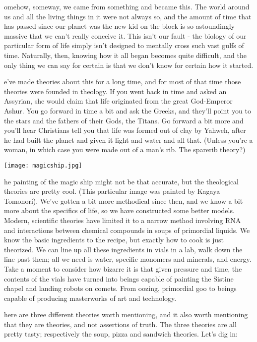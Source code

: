 omehow, someway, we came from something and became this. The world around us and all the living things in it were not always so, and the amount of time that has passed since our planet was the new kid on the block is so astoundingly massive that we can’t really conceive it. This isn’t our fault - the biology of our particular form of life simply isn’t designed to mentally cross such vast gulfs of time. Naturally, then, knowing how it all began becomes quite difficult, and the only thing we can say for certain is that we don’t know for certain how it started.

e’ve made theories about this for a long time, and for most of that time those theories were founded in theology. If you went back in time and asked an Assyrian, she would claim that life originated from the great God-Emperor Ashur. You go forward in time a bit and ask the Greeks, and they’ll point you to the stars and the fathers of their Gods, the Titans. Go forward a bit more and you’ll hear Christians tell you that life was formed out of clay by Yahweh, after he had built the planet and given it light and water and all that. (Unless you’re a woman, in which case you were made out of a man’s rib. The sparerib theory?) 

\begin{center}
	\texttt{[image: magicship.jpg]}
\end{center}

he painting of the magic ship might not be that accurate, but the theological theories are pretty cool. (This particular image was painted by Kagaya Tomonori). We’ve gotten a bit more methodical since then, and we know a bit more about the specifics of life, so we have constructed some better models. Modern, scientific theories have limited it to a narrow method involving RNA and interactions between chemical compounds in soups of primordial liquids. We know the basic ingredients to the recipe, but exactly how to cook is just theorized. We can line up all these ingredients in vials in a lab, walk down the line past them; all we need is water, specific monomers and minerals, and energy. Take a moment to consider how bizarre it is that given pressure and time, the contents of the vials have turned into beings capable of painting the Sistine chapel and landing robots on comets. From oozing, primordial goo to beings capable of producing masterworks of art and technology.

here are three different theories worth mentioning, and it also worth mentioning that they are theories, and not assertions of truth. The three theories are all pretty tasty; respectively the soup, pizza and sandwich theories. Let’s dig in:

